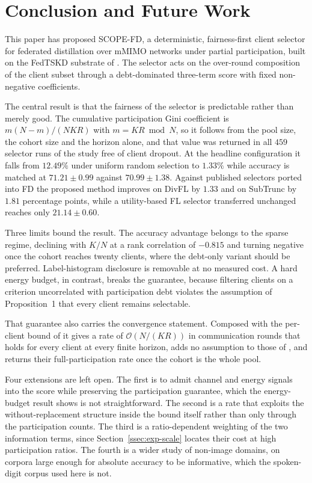\documentclass[journal]{IEEEtran}
\newcommand{\new}[1]{#1}
\newcommand{\rev}[1]{{\color{blue}#1}}
\begin{document}
\section{Conclusion and Future Work}
\label{sec:conclusion}
This paper has proposed SCOPE-FD, a deterministic, fairness-first client selector for federated distillation over mMIMO networks under partial participation, built on the FedTSKD substrate of \cite{mu2024fedtskd}. The selector acts on the over-round composition of the client subset through a debt-dominated three-term score with fixed non-negative coefficients.

\rev{The central result is that the fairness of the selector is predictable rather than merely good. The cumulative participation Gini coefficient is $m(N-m)/(NKR)$ with $m = KR \bmod N$, so it follows from the pool size, the cohort size and the horizon alone, and that value was returned in all $459$ selector runs of the study free of client dropout. At the headline configuration it falls from $12.49\%$ under uniform random selection to $1.33\%$ while accuracy is matched at $71.21 \pm 0.99$ against $70.99 \pm 1.38$. Against published selectors ported into FD the proposed method improves on DivFL by $1.33$ and on SubTrunc by $1.81$ percentage points, while a utility-based FL selector transferred unchanged reaches only $21.14 \pm 0.60$.}

\rev{Three limits bound the result. The accuracy advantage belongs to the sparse regime, declining with $K/N$ at a rank correlation of $-0.815$ and turning negative once the cohort reaches twenty clients, where the debt-only variant should be preferred. Label-histogram disclosure is removable at no measured cost. A hard energy budget, in contrast, breaks the guarantee, because filtering clients on a criterion uncorrelated with participation debt violates the assumption of Proposition~1 that every client remains selectable.}

\rev{That guarantee also carries the convergence statement. Composed with the per-client bound of \cite{mu2024fedtskd} it gives a rate of $\mathcal{O}(N/(KR))$ in communication rounds that holds for every client at every finite horizon, adds no assumption to those of \cite{mu2024fedtskd}, and returns their full-participation rate once the cohort is the whole pool.}

\new{Four extensions are left open. The first is to admit channel and energy signals into the score while preserving the participation guarantee, which the energy-budget result shows is not straightforward. \rev{The second is a rate that exploits the without-replacement structure inside the bound itself rather than only through the participation counts.} The third is a ratio-dependent weighting of the two information terms, since Section~\ref{ssec:exp-scale} locates their cost at high participation ratios. \rev{The fourth is a wider study of non-image domains, on corpora large enough for absolute accuracy to be informative, which the spoken-digit corpus used here is not.}}
\end{document}

